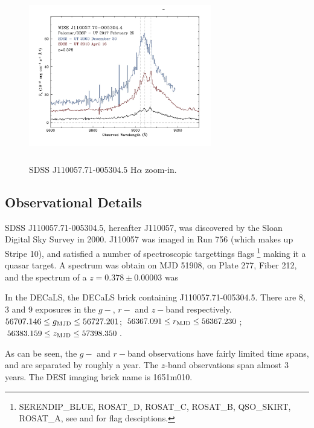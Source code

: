 \documentclass{emulateapj}
\begin{document}
\begin{figure}
  \includegraphics[width=8.00cm, height=7.50cm, trim=0.0cm 0.0cm 0.0cm 0.0cm, clip]
  {../plots/w1100m0052_halpha.jpg}
  \centering
  \caption[]{SDSS J110057.71-005304.5 H$\alpha$ zoom-in.}
 \label{fig:w1100m0052_halpha}
\end{figure}


\subsection{Observational Details}
SDSS J110057.71-005304.5, hereafter J110057, was discovered by 
the Sloan Digital Sky Survey in 2000. 
 J110057 was imaged in Run 756 (which makes up Stripe 10), 
and satisfied a number of spectroscopic targettings flags
\footnote{SERENDIP\_BLUE, ROSAT\_D,  ROSAT\_C,  ROSAT\_B, QSO\_SKIRT, ROSAT\_A, 
see \citet{EDR} and \citet{Richards02} for flag desciptions.}
making it a quasar target. A spectrum was obtain on MJD 51908, on Plate 
277, Fiber 212, and the spectrum of a $z=0.378\pm0.00003$ was

In the DECaLS, the DECaLS brick containing J110057.71-005304.5.
There are 8, 3 and 9 exposures in the $g-$, $r-$ and $z-$band 
respectively. 
$56707.146 \leq g_{\rm MJD} \leq  56727.201$;  
$56367.091 \leq  r_{\rm MJD} \leq  56367.230$; 
$56383.159 \leq  z_{\rm MJD} \leq  57398.350$. 

As can be seen, the $g-$ and $r-$band observations have fairly limited
time spans, and are separated by roughly a year. The $z$-band
observations span almost 3 years.  The DESI imaging brick name is
1651m010.
\end{document}
